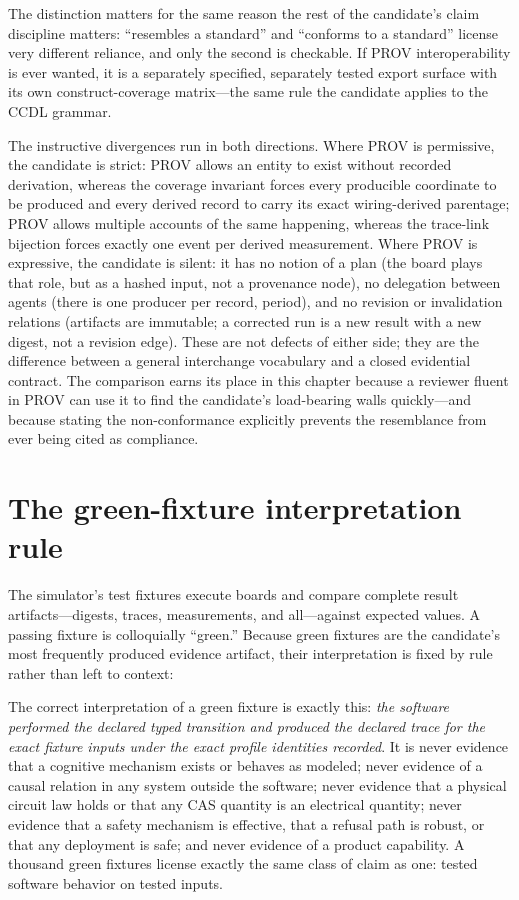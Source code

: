 The distinction matters for the same reason the rest of the candidate's claim discipline matters: ``resembles a standard'' and ``conforms to a standard'' license very different reliance, and only the second is checkable. If PROV interoperability is ever wanted, it is a separately specified, separately tested export surface with its own construct-coverage matrix---the same rule the candidate applies to the CCDL grammar.

The instructive divergences run in both directions. Where PROV is permissive, the candidate is strict: PROV allows an entity to exist without recorded derivation, whereas the coverage invariant forces every producible coordinate to be produced and every derived record to carry its exact wiring-derived parentage; PROV allows multiple accounts of the same happening, whereas the trace-link bijection forces exactly one event per derived measurement. Where PROV is expressive, the candidate is silent: it has no notion of a plan (the board plays that role, but as a hashed input, not a provenance node), no delegation between agents (there is one producer per record, period), and no revision or invalidation relations (artifacts are immutable; a corrected run is a new result with a new digest, not a revision edge). These are not defects of either side; they are the difference between a general interchange vocabulary and a closed evidential contract. The comparison earns its place in this chapter because a reviewer fluent in PROV can use it to find the candidate's load-bearing walls quickly---and because stating the non-conformance explicitly prevents the resemblance from ever being cited as compliance.

\section{The green-fixture interpretation rule}\label{ch08:sec:green}

The simulator's test fixtures execute boards and compare complete result artifacts---digests, traces, measurements, and all---against expected values. A passing fixture is colloquially ``green.'' Because green fixtures are the candidate's most frequently produced evidence artifact, their interpretation is fixed by rule rather than left to context:

\begin{boundary}\label{ch08:bd:green}
The correct interpretation of a green fixture is exactly this: \emph{the software performed the declared typed transition and produced the declared trace for the exact fixture inputs under the exact profile identities recorded}. It is never evidence that a cognitive mechanism exists or behaves as modeled; never evidence of a causal relation in any system outside the software; never evidence that a physical circuit law holds or that any CAS quantity is an electrical quantity; never evidence that a safety mechanism is effective, that a refusal path is robust, or that any deployment is safe; and never evidence of a product capability. A thousand green fixtures license exactly the same class of claim as one: tested software behavior on tested inputs.
\end{boundary}


